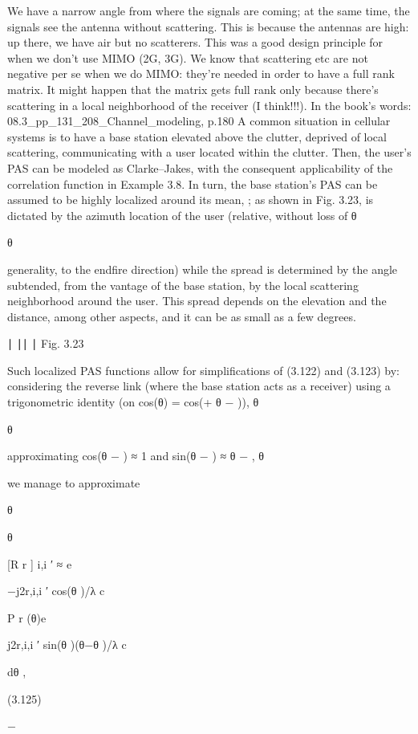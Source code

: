 {{{{We have a narrow angle from where the signals are coming; at the same time, the signals see the antenna without scattering. This is because the antennas are high: up there, we have air but no scatterers.
This was a good design principle for when we don't use MIMO (2G, 3G). We know that scattering etc are not negative per se when we do MIMO: they're needed in order to have a full rank matrix.
It might happen that the matrix gets full rank only because there's scattering in a local neighborhood of the receiver (I think!!!).
In the book's words:
08.3_pp_131_208_Channel_modeling, p.180 A common situation in cellular systems is to have a base station elevated above the clutter, deprived of local scattering, communicating with a user located within the clutter. Then, the user’s PAS can be modeled as Clarke–Jakes, with the consequent applicability of the correlation function in Example 3.8. In turn, the base station’s PAS can be assumed to be highly localized around its mean, \mu ; as shown in Fig.
3.23, \mu is dictated by the azimuth location of the user (relative, without loss of θ

θ

generality, to the endfire direction) while the spread is determined by the angle subtended, from the vantage of the base station, by the local scattering neighborhood around the user. This spread depends on the elevation and the distance, among other aspects, and it can be as small as a few degrees.

∣ ∣∣ ∣
Fig. 3.23

Such localized PAS functions allow for simplifications of (3.122) and (3.123) by:
considering the reverse link (where the base station acts as a receiver)
using a trigonometric identity (on cos(θ) = cos(\mu + θ − \mu )),
θ

θ

approximating cos(θ − \mu ) ≈ 1 and sin(θ − \mu ) ≈ θ − \mu ,
θ

we manage to approximate

θ

θ

\pi

[R r ] i,i ′ ≈ e

−j2\pid r,i,i ′ cos(\mu θ )/λ c

\int

P r (θ)e

j2\pid r,i,i ′ sin(\mu θ )(θ−\mu θ )/λ c

dθ ,

(3.125)

−\pi

}}}}
